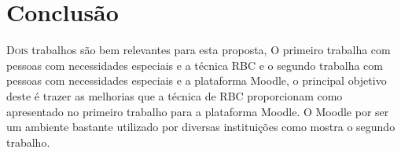 \documentclass{article}
\begin{document}
\section{Conclusão}
\lettrine{D}{ois} trabalhos são bem relevantes para esta proposta, O primeiro \citep{azeta2009case}  trabalha com pessoas com necessidades especiais e a técnica RBC e o segundo \citep{rezende2005abaco} trabalha com pessoas com necessidades especiais e a plataforma Moodle, o principal objetivo deste é trazer as melhorias que a técnica de RBC proporcionam como apresentado no primeiro trabalho para a plataforma Moodle. O Moodle por ser um ambiente bastante utilizado por diversas instituições como mostra o segundo trabalho.



\end{document}
